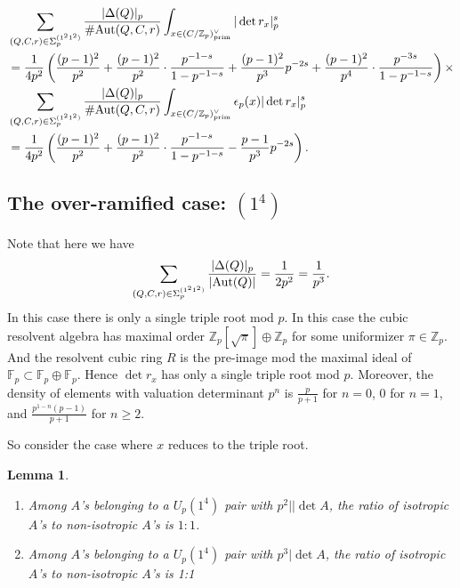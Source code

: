 \documentclass{article}
\def\Z{{\mathbb Z}}
\def\Aut{{\rm Aut}}
\def\prim{{\rm prim}}
\def\F{{\mathbb F}}
\def\Z{{\mathbb Z}}
\def\F{{\mathbb F}}
\newtheorem{lemma}[theorem]{Lemma}
\begin{document}
\begin{align*}
&\displaystyle\sum_{(Q,C,r)\in\Sigma_p^{(1^21^2)}}\frac{|\Delta(Q)|_p}{\#\Aut(Q,C,r)}\int_{x\in (C/\Z_p)^{\vee}_{\prim}}  |\det{r_x}|_p^{s}\\&=\frac{1}{4p^2}\left(\frac{(p-1)^2}{p^2} + \frac{(p-1)^2}{p^2}\cdot \frac{p^{-1-s}}{1-p^{-1-s}} + \frac{(p-1)^2}{p^3}p^{-2s}+ \frac{(p-1)^2}{p^4}\cdot\frac{p^{-3s}}{1-p^{-1-s}}\right)\times\\
 &\displaystyle\sum_{(Q,C,r)\in\Sigma_p^{(1^21^2)}}\frac{|\Delta(Q)|_p}{\#\Aut(Q,C,r)}\int_{x\in (C/\Z_p)^{\vee}_{\prim}}  \epsilon_p(x)|\det{r_x}|_p^{s}\\ &= \frac{1}{4p^2}\left(\frac{(p-1)^2}{p^2} + \frac{(p-1)^2}{p^2}\cdot \frac{p^{-1-s}}{1-p^{-1-s}} - \frac{p-1}{p^3}p^{-2s}\right).
\end{align*}

\subsection{The over-ramified case: $(1^4)$}

Note that here we have $$\sum_{(Q,C,r)\in\Sigma^{(1^21^2)}_p}\frac{|\Delta(Q)|_p}{|\Aut(Q)|}=\frac{1}{2p^2}=\frac{1}{p^3}.$$
In this case there is only a single triple root mod $p$. 
In this case the cubic resolvent algebra has maximal order $\Z_p[\sqrt{\pi}]\oplus \Z_p$ for some uniformizer $\pi\in\Z_p$. And the resolvent cubic ring $R$ is the pre-image mod the maximal ideal of $\F_p\subset \F_p\oplus \F_p$. Hence $\det r_x$ has only a single triple root mod $p$. Moreover, the density of elements with valuation determinant $p^n$ is $\frac{p}{p+1}$ for $n=0$, $0$ for $n=1$, and $\frac{p^{1-n}(p-1)}{p+1}$ for $n\geq 2$. 

So consider the case where $x$ reduces to the triple root. 


\begin{lemma}\label{lem:type1^4isotropy}
\begin{enumerate}
    \item Among $A$'s belonging to a $U_p(1^4)$ pair with $p^2 || \det A$, the ratio of isotropic $A$'s to non-isotropic $A$'s is $1 : 1$.
    \item Among $A$'s belonging to a $U_p(1^4)$ pair with $p^3 | \det A$, the ratio of isotropic $A$'s to non-isotropic $A$'s is 1:1
\end{enumerate} 
\end{lemma}
\end{document}
